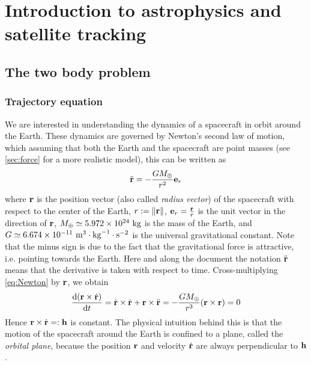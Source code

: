 \documentclass[../main.tex]{subfiles}
\begin{document}
\section{Introduction to astrophysics and satellite tracking}
\subsection{The two body problem}\label{sec:twoBody}
\subsubsection{Trajectory equation}
We are interested in understanding the dynamics of a spacecraft in orbit around the Earth. These dynamics are governed by Newton's second law of motion, which assuming that both the Earth and the spacecraft are point masses (see \cref{sec:force} for a more realistic model), this can be written as
\begin{equation}
  \label{eq:Newton}
  \ddot{\boldsymbol{\mathrm{r}}}=-\frac{GM_{\oplus}}{r^2}\boldsymbol{\mathrm{e}}_r
\end{equation}
where $\boldsymbol{\mathrm{r}}$ is the position vector (also called \emph{radius vector}) of the spacecraft with respect to the center of the Earth, $r:=\left\|\boldsymbol{\mathrm{r}}\right\|$, $\boldsymbol{\mathrm{e}}_r=\frac{\boldsymbol{\mathrm{r}}}{r}$ is the unit vector in the direction of $\boldsymbol{\mathrm{r}}$, $M_{\oplus}\simeq 5.972\times 10^{24}\ \kg$ is the mass of the Earth, and $G\simeq 6.674\times 10^{-11}\ \mathrm{m}^3\cdot \mathrm{kg}^{-1}\cdot\mathrm{s}^{-2}$ is the universal gravitational constant. Note that the minus sign is due to the fact that the gravitational force is attractive, i.e. pointing towards the Earth.
Here and along the document the notation $\ddot{\boldsymbol{\mathrm{r}}}$ means that the derivative is taken with respect to time.
Cross-multiplying \cref{eq:Newton} by $\boldsymbol{\mathrm{r}}$, we obtain
\begin{equation}
  \dv{(\boldsymbol{\mathrm{r}}\times \dot{\boldsymbol{\mathrm{r}}})}{t}=\dot{\boldsymbol{\mathrm{r}}}\times \dot{\boldsymbol{\mathrm{r}}}+\boldsymbol{\mathrm{r}}\times\ddot{\boldsymbol{\mathrm{r}}}=-\frac{GM_{\oplus}}{r^3}(\boldsymbol{\mathrm{r}}\times \boldsymbol{\mathrm{r}})=0
\end{equation}
Hence $\boldsymbol{\mathrm{r}}\times \dot{\boldsymbol{\mathrm{r}}}=:\boldsymbol{\mathrm{h}}$ is constant. The physical intuition behind this is that the motion of the spacecraft around the Earth is confined to a plane, called the \emph{orbital plane}, because the position $\boldsymbol{\mathrm{r}}$ and velocity $\dot{\boldsymbol{\mathrm{r}}}$ are always perpendicular to $\boldsymbol{\mathrm{h}}$.
\end{document}
